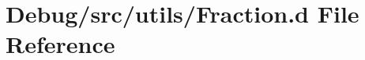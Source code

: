 \hypertarget{_fraction_8d}{}\section{Debug/src/utils/\+Fraction.d File Reference}
\label{_fraction_8d}
